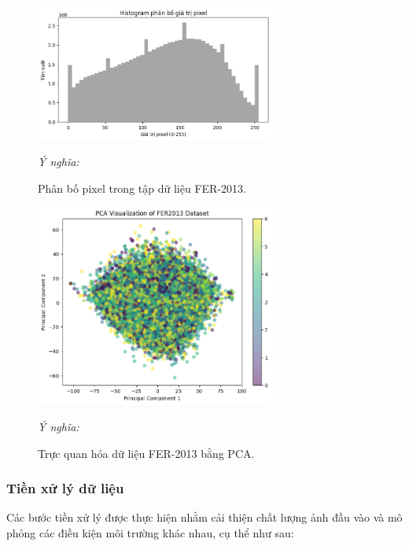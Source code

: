 \begin{figure}[H]
    \centering
    \includegraphics[width=0.7\textwidth]{img/phan_bo_pixel.png} %
    \caption{Phân bố pixel trong tập dữ liệu FER-2013.}
    \label{fig:pixel_distribution}
    \par\vspace{0.5cm} %
    \textit{Ý nghĩa:} 
\end{figure}

\begin{figure}[H]
    \centering
    \includegraphics[width=0.7\textwidth]{img/PCA.png} %
    \caption{Trực quan hóa dữ liệu FER-2013 bằng PCA.}
    \label{fig:pca_visualization}
    \par\vspace{0.5cm} %
    \textit{Ý nghĩa:} 
\end{figure}


\subsubsection{Tiền xử lý dữ liệu}

Các bước tiền xử lý được thực hiện nhằm cải thiện chất lượng ảnh đầu vào và mô phỏng các điều kiện môi trường khác nhau, cụ thể như sau:

